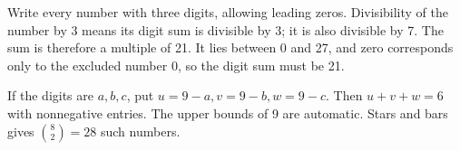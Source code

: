 Write every number with three digits, allowing leading zeros. Divisibility of the number by 3 means its digit sum is divisible by 3; it is also divisible by 7. The sum is therefore a multiple of 21. It lies between 0 and 27, and zero corresponds only to the excluded number 0, so the digit sum must be 21.

If the digits are $a,b,c$, put $u=9-a,v=9-b,w=9-c$. Then $u+v+w=6$ with nonnegative entries. The upper bounds of 9 are automatic. Stars and bars gives $\binom82=\boxed{28}$ such numbers.
